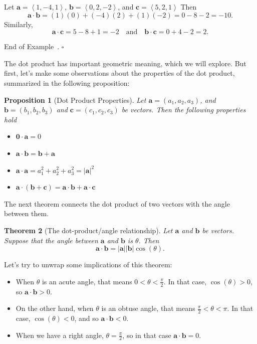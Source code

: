 \documentclass[10pt]{article}
\newtheorem{theorem}{Theorem}
\newtheorem{proposition}[theorem]{Proposition}
\theoremstyle{definition}
\newtheorem{example}[theorem]{Example}
\renewenvironment{example}
{\begin{oldexample}}
  {\par\smallskip\hfill   End of Example~\theexample. $\square$    \par\end{oldexample}}
\newcommand{\1}[1]{\textbf{1}_{\left[#1\right]}} %
\begin{document}
\begin{example}
  Let $\mathbf{a} = \left\langle 1,-4,1 \right\rangle$, $\mathbf{b} = \left\langle 0,2,-2 \right\rangle$, and
  $\mathbf{c} = \left\langle 5,2,1 \right\rangle $
  Then
  \begin{equation*}
    \mathbf{a} \cdot \mathbf{b} = (1)(0)+ (-4)(2)+(1)(-2) = 0-8-2 = -10.
  \end{equation*}
  Similarly,
  \begin{equation*}
    \mathbf{a}\cdot \mathbf{c} = 5-8+1 = -2
    \quad \text{and} \quad
    \mathbf{b} \cdot \mathbf{c} = 0 +4-2 = 2.
  \end{equation*}
\end{example}

The dot product has important geometric meaning, which we will explore. But first, let's make some
observations about the properties of the dot product, summarized in the following proposition:

\begin{proposition}[Dot Product Properties]
  Let $\mathbf{a}=(a_{1},a_{2},a_{3})$, and $\mathbf{b} = (b_{1},b_{2},b_{3})$ and
  $\mathbf{c}=(c_{1},c_{2},c_{3})$ be vectors. Then the following properties hold
  \begin{itemize}
    \item $\mathbf{0} \cdot \mathbf{a} = 0$
    \item $\mathbf{a}\cdot \mathbf{b} = \mathbf{b} + \mathbf{a}$ 
    \item $\mathbf{a}\cdot \mathbf{a} = a_{1}^{2}+a_{2}^{2}+a_{3}^{2} = |\mathbf{a}|^{2}$ 
    \item $\mathbf{a}\cdot (\mathbf{b}+\mathbf{c}) = \mathbf{a}\cdot \mathbf{b} + \mathbf{a} \cdot\mathbf{c} $
  \end{itemize}
\end{proposition}

The next theorem connects the dot product of two vectors with the angle between them.

\begin{theorem}[The dot-product/angle relationship]
  \label{thm:dot-productangle-relationship}
  Let $\mathbf{a}$ and $\mathbf{b}$ be vectors. Suppose that the angle between $\mathbf{a}$ and $\mathbf{b}$ is
  $\theta$. Then
  \begin{equation*}
    \mathbf{a}\cdot \mathbf{b} = | \mathbf{a} | |\mathbf{b}| \cos(\theta).
  \end{equation*}
\end{theorem}
Let's try to unwrap some implications of this theorem:
\begin{itemize}
  \item When $\theta$ is an acute angle, that means $0 < \theta < \frac{\pi}{2}$. In that case, $\cos(\theta)>0$,
  so $\mathbf{a}\cdot \mathbf{b} >0$.
  \item On the other hand, when $\theta $ is an obtuse angle, that means $\frac{\pi}{2}< \theta < \pi$.
  In that case, $\cos(\theta)<0$, and so $\mathbf{a}\cdot \mathbf{b} <0$.
  \item When we have a right angle, $\theta=\frac{\pi}{2}$, so in that case $\mathbf{a}\cdot \mathbf{b} =0$. 
\end{itemize}
\end{document}
